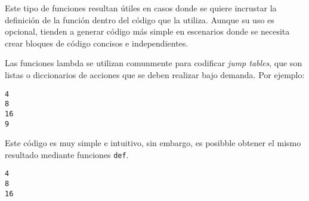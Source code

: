 Este tipo de funciones resultan útiles en casos donde se quiere
incrustar la definición de la función dentro del código que la utiliza.
Aunque su uso es opcional, tienden a generar código más simple en
escenarios donde se necesita crear bloques de código concisos e
independientes.

Las funciones lambda se utilizan comunmente para codificar \emph{jump
tables}, que son listas o diccionarios de acciones que se deben realizar
bajo demanda. Por ejemplo:

\begin{Shaded}
\begin{Highlighting}[]
\OperatorTok{=}\NormalTok{ [}\OperatorTok{**}\NormalTok{, }\OperatorTok{**}\NormalTok{, }\OperatorTok{**}\NormalTok{]   }

    \NormalTok{))}

\NormalTok{(L[}\NormalTok{](}\NormalTok{))}
\end{Highlighting}
\end{Shaded}

\begin{verbatim}
4
8
16
9
\end{verbatim}

Este código es muy simple e intuitivo, sin embargo, es posibble obtener
el mismo resultado mediante funciones \texttt{def}.

\begin{Shaded}
\begin{Highlighting}[]
\OperatorTok{**}
\OperatorTok{**}
\OperatorTok{**}

\OperatorTok{=}\NormalTok{ [f1, f2, f3]}

    \NormalTok{))}
\end{Highlighting}
\end{Shaded}

\begin{verbatim}
4
8
16
\end{verbatim}

